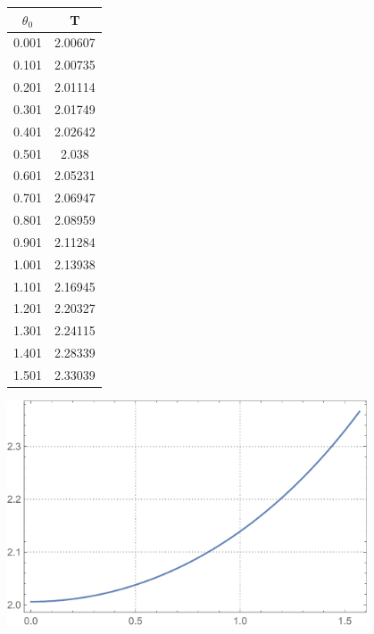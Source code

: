 \documentclass[reqno, a4paper]{amsart}
\begin{document}
		\begin{minipage}{\textwidth}
			\begin{minipage}[b]{0.25\textwidth}
				\centering
				\begin{tabular}{|c|c|}
					\hline
					$\theta_{0}$ & T \\ 
					\hline
					0.001& 2.00607\\0.101& 2.00735\\0.201& 2.01114\\0.301& 2.01749\\0.401& 2.02642\\0.501& 2.038\\0.601& 2.05231\\0.701& 2.06947\\0.801& 2.08959\\0.901& 2.11284\\
					1.001& 2.13938\\1.101& 2.16945\\1.201& 2.20327\\1.301& 2.24115\\1.401& 2.28339\\1.501& 2.33039\\
					\hline
				\end{tabular}
			\end{minipage}
			\begin{minipage}[b]{0.79\textwidth}
				\centering
				\includegraphics[width=0.8\textwidth]{Elipticky integral, Perioda}
			\end{minipage}
			\hfill
		\end{minipage}
\end{document}
